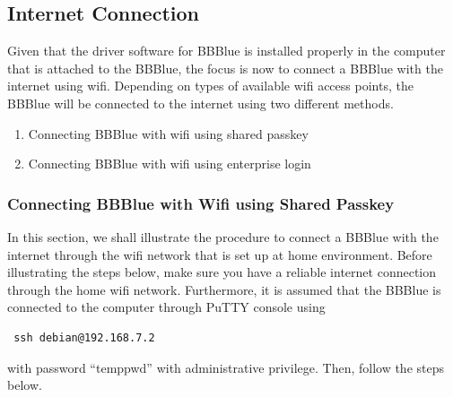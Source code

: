 \subsection{Internet Connection}
Given that the driver software for BBBlue is installed properly in the computer
that is attached to the BBBlue, the focus is now to connect a BBBlue with the
internet using wifi. Depending on types of available wifi access points, the
BBBlue will be connected to the internet using two different methods. %
%
\begin{enumerate}
\item Connecting BBBlue with wifi using shared passkey
  
\item Connecting BBBlue with wifi using enterprise login  
\end{enumerate}

\subsubsection{Connecting BBBlue with Wifi using Shared Passkey}

In this section, we shall illustrate the procedure to connect a BBBlue with the
internet through the wifi network that is set up at home environment. Before
illustrating the steps below, make sure you have a reliable internet connection
through the home wifi network. Furthermore, it is assumed that the BBBlue is
connected to the computer through PuTTY console using 

\begin{verbatim}
 ssh debian@192.168.7.2
\end{verbatim}

with password ``temppwd'' with administrative privilege. Then, follow the steps
below.  

